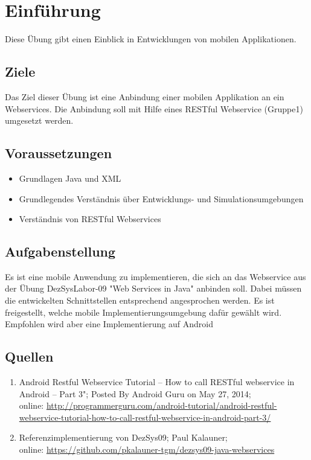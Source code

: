
\section{Einführung}
Diese Übung gibt einen Einblick in Entwicklungen von mobilen Applikationen.

\subsection{Ziele}
Das Ziel dieser Übung ist eine Anbindung einer mobilen Applikation an ein Webservices. Die Anbindung soll mit Hilfe eines RESTful Webservice (Gruppe1) umgesetzt werden.

\subsection{Voraussetzungen}
\begin{itemize}
    \item Grundlagen Java und XML
    \item Grundlegendes Verständnis über Entwicklungs- und Simulationsumgebungen
    \item Verständnis von RESTful Webservices
\end{itemize}

\subsection{Aufgabenstellung}
Es ist eine mobile Anwendung zu implementieren, die sich an das Webservice aus der Übung DezSysLabor-09 "Web Services in Java" anbinden soll. Dabei müssen die entwickelten Schnittstellen entsprechend angesprochen werden.
Es ist freigestellt, welche mobile Implementierungsumgebung dafür gewählt wird. Empfohlen wird aber eine Implementierung auf Android

\subsection{Quellen}
\begin{enumerate}
\item Android Restful Webservice Tutorial – How to call RESTful webservice in Android – Part 3"; Posted By Android Guru on May 27, 2014;\\ online: \url{http://programmerguru.com/android-tutorial/android-restful-webservice-tutorial-how-to-call-restful-webservice-in-android-part-3/}
\item Referenzimplementierung von DezSys09; Paul Kalauner;\\ online: \url{https://github.com/pkalauner-tgm/dezsys09-java-webservices}
\end{enumerate}    


